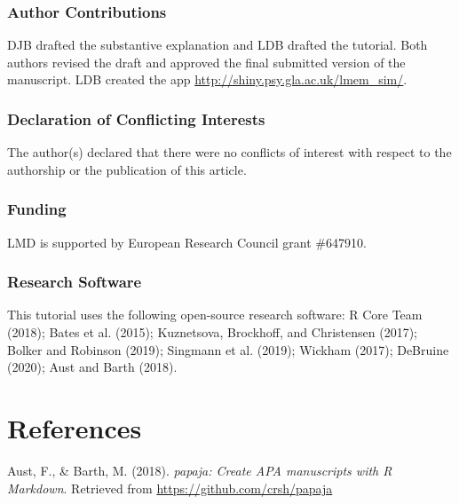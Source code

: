 \documentclass[
  english,
  doc,floatsintext]{apa6}
\begin{document}
\hypertarget{author-contributions}{%
\subsubsection{Author Contributions}\label{author-contributions}}

DJB drafted the substantive explanation and LDB drafted the tutorial. Both authors revised the draft and approved the final submitted version of the manuscript. LDB created the app \url{http://shiny.psy.gla.ac.uk/lmem_sim/}.

\hypertarget{declaration-of-conflicting-interests}{%
\subsubsection{Declaration of Conflicting Interests}\label{declaration-of-conflicting-interests}}

The author(s) declared that there were no conflicts of interest with respect to the authorship or the publication of this article.

\hypertarget{funding}{%
\subsubsection{Funding}\label{funding}}

LMD is supported by European Research Council grant \#647910.

\hypertarget{research-software}{%
\subsubsection{Research Software}\label{research-software}}

This tutorial uses the following open-source research software: R Core Team (2018); Bates et al. (2015); Kuznetsova, Brockhoff, and Christensen (2017); Bolker and Robinson (2019); Singmann et al. (2019); Wickham (2017); DeBruine (2020); Aust and Barth (2018).

\newpage

\hypertarget{references}{%
\section{References}\label{references}}

\begingroup
\setlength{\parindent}{-0.5in}
\setlength{\leftskip}{0.5in}

\hypertarget{refs}{}
\leavevmode\hypertarget{ref-R-papaja}{}%
Aust, F., \& Barth, M. (2018). \emph{papaja: Create APA manuscripts with R Markdown}. Retrieved from \url{https://github.com/crsh/papaja}
\end{document}
